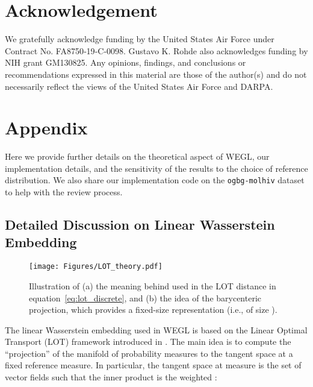 \documentclass[table]{article} \usepackage{iclr2021_conference,times}
\def\eqref#1{equation~\ref{#1}}
\begin{document}
\section*{Acknowledgement}
We gratefully acknowledge funding by the United States Air Force under Contract No. FA8750‐19‐C‐0098. Gustavo K. Rohde also acknowledges funding by NIH grant GM130825. Any opinions, findings, and conclusions or recommendations expressed in this material are those of the author(s) and do not necessarily reflect the views of the United States Air Force and DARPA. 






\newpage
\clearpage
\appendix
\section{Appendix}
\label{sec:appx}

Here we provide further details on the theoretical aspect of WEGL, our implementation details, and the sensitivity of the results to the choice of reference distribution. We also share our implementation code on the \texttt{ogbg-molhiv} dataset to help with the review process.

\vspace{-0.05in}
\subsection{Detailed Discussion on Linear Wasserstein Embedding}
\label{sec:appx:lot}

\begin{figure}[b]
    \centering
    \texttt{[image: Figures/LOT\_theory.pdf]}
    \caption{Illustration of (a) the meaning behind  used in the LOT distance in \eqref{eq:lot_discrete}, and (b) the idea of the barycenteric projection, which provides a fixed-size representation (i.e., of size ).}
    \label{fig:lot_theory}
\end{figure}

The linear Wasserstein embedding used in WEGL is based on the Linear Optimal Transport (LOT) framework introduced in \citep{wang2013linear}. The main idea is to compute the ``projection'' of the manifold of probability measures to the tangent space at a fixed reference measure. In particular, the tangent space at measure  is the set of vector fields  such that the inner product is the weighted :
\vspace{-.07in}
\end{document}
